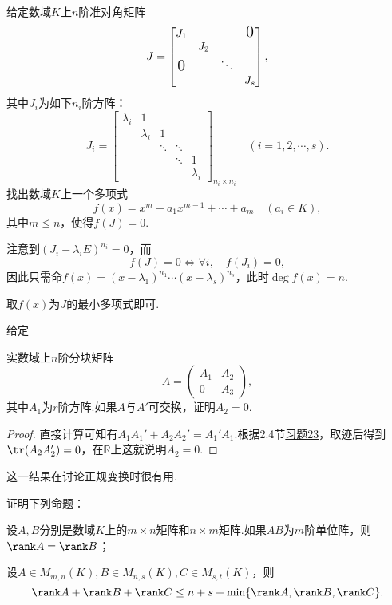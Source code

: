 \begin{prob}
	给定数域$K$上$n$阶准对角矩阵
	\[
		J=\begin{bmatrix}
			J_1                &     &        & \mbox{\Large{$0$}} \\
			                   & J_2 &        &                    \\
			\mbox{\Large{$0$}} &     & \ddots &                    \\
			                   &     &        & J_s
		\end{bmatrix},
	\]
	其中$J_i$为如下$n_i$阶方阵：
	\[
		J_i=\begin{bmatrix}
			\lambda_i & 1         &        &        &           \\
			          & \lambda_i & 1      &        &           \\
			          &           & \ddots & \ddots &           \\
			          &           &        & \ddots & 1         \\
			          &           &        &        & \lambda_i
		\end{bmatrix}_{n_i\times n_i}\quad(i=1,2,\cdots,s).
	\]
	找出数域$K$上一个多项式
	\[
		f(x)=x^m+a_1x^{m-1}+\cdots+a_m\quad(a_i\in K),
	\]
	其中$m\le n$，使得$f(J)=0$.
\end{prob}
\begin{sol}[法一]
	注意到$(J_i-\lambda_iE)^{n_i}=0$，而
	\[
		f(J)=0\iff \forall i,\quad f(J_i)=0,
	\]
	因此只需命$f(x)=(x-\lambda_1)^{n_1}\cdots(x-\lambda_s)^{n_s}$，此时$\deg f(x)=n$.
\end{sol}
\begin{sol}[法二]
	取$f(x)$为$J$的最小多项式即可.
\end{sol}
\begin{prob}[11]
	\hypertarget{LemmaOfNormalTransformationSubspace}{给定}实数域上$n$阶分块矩阵
	\[
		A=\begin{pmatrix}
			A_1 & A_2 \\
			0   & A_3
		\end{pmatrix},
	\]
	其中$A_1$为$r$阶方阵.如果$A$与$A'$可交换，证明$A_2=0$.
\end{prob}
\begin{proof}
	直接计算可知有$A_1A_1'+A_2A_2'=A_1'A_1$.根据2.4节\hyperlink{TraceProperty}{习题23}，取迹后得到$\tr(A_2A_2')=0$，在$\mathbb{R}$上这就说明$A_2=0$.
\end{proof}
\begin{note}
	这一结果在讨论正规变换时很有用.
\end{note}
\begin{prob}[12]
	证明下列命题：
	\begin{mylist}
		\item 设$A,B$分别是数域$K$上的$m\times n$矩阵和$n\times m$矩阵.如果$AB$为$m$阶单位阵，则$\rank A=\rank B$；
		\item 设$A\in M_{m,n}(K),B\in M_{n,s}(K),C\in M_{s,t}(K)$，则
		\[
			\rank A+\rank B+\rank C\le n+s+\min\{\rank A,\rank B,\rank C\}.
		\]
	\end{mylist}
\end{prob}
